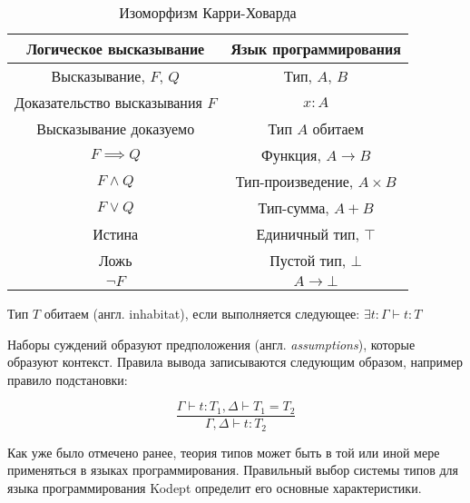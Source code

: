 \begin{table}[H]
    \centering
    \caption{Изоморфизм Карри-Ховарда}
    \label{tab:curry-hovard-iso}
    \begin{tabular}{|c|c|}
        \hline
        \textbf{Логическое высказывание} & \textbf{Язык программирования} \\\hline
        Высказывание, $F$, $Q$           & Тип, $A$, $B$                  \\\hline
        Доказательство высказывания $F$  & $x: A$                         \\\hline
        Высказывание доказуемо           & Тип $A$ обитаем                \\\hline
        $F \implies Q$                   & Функция, $A \to B$             \\\hline
        $F \wedge Q$                     & Тип-произведение, $A \times B$ \\\hline
        $F \vee Q$                       & Тип-сумма, $A + B$             \\\hline
        Истина                           & Единичный тип, $\top$          \\\hline
        Ложь                             & Пустой тип, $\bot$             \\\hline
        $\neg F$                         & $A \to \bot$                   \\\hline
    \end{tabular}
\end{table}

Тип $T$ обитаем (англ. inhabitat), если выполняется следующее: $\exists t: \Gamma \vdash t: T$

Наборы суждений образуют предположения (англ. \textit{assumptions}), которые образуют контекст.
Правила вывода записываются следующим образом, например правило подстановки:

\begin{equation}
    \label{eq:judgement_substitution}
    \frac{\Gamma \vdash t: T_1, \Delta \vdash T_1 = T_2}{\Gamma, \Delta \vdash t: T_2}
\end{equation}

Как уже было отмечено ранее, теория типов может быть в той или иной мере применяться в языках программирования.
Правильный выбор системы типов для языка программирования Kodept определит его основные характеристики.


